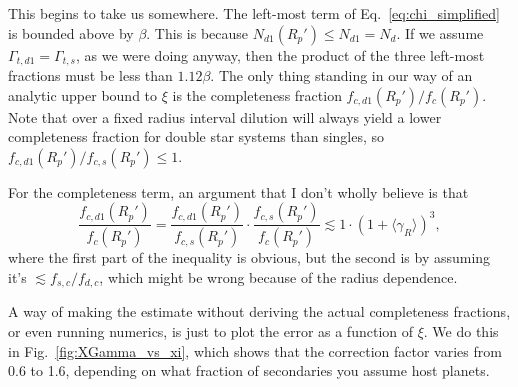 \documentclass{emulateapj}
\begin{document}
This begins to take us somewhere. The left-most term of 
Eq.~\ref{eq:chi_simplified} is bounded above by $\beta$. This is because 
$N_{d1}(R_p') \leq N_{d1} = N_d$.
If we assume $\Gamma_{t,d1} = \Gamma_{t,s}$, as we were doing 
anyway, then the product of the three left-most fractions must be less than 
$1.12\beta$.
The only thing standing in our way of an analytic upper bound to $\xi$ is the 
completeness fraction $f_{c,d1}(R_p')/f_c(R_p')$.
Note that over a fixed radius interval dilution will always 
yield a lower completeness fraction for double star systems than singles, so 
$f_{c,d1}(R_p') / f_{c,s}(R_p') \leq 1$.

For the completeness term, an argument that I don't wholly believe
is that
\begin{equation}
\frac{f_{c,d1}(R_p')}{f_c(R_p')} = \frac{f_{c,d1}(R_p')}{f_{c,s}(R_p')} \cdot
	\frac{f_{c,s}(R_p')}{f_{c}(R_p')} \lesssim 1 \cdot (1+\langle \gamma_R 
	\rangle)^3,
\end{equation}
where the first part of the inequality is obvious, but the second is by 
assuming it's $\lesssim f_{s,c}/f_{d,c}$, which might be wrong because of 
the radius dependence.

A way of making the estimate without deriving the actual 
completeness fractions, or even running numerics, is just to plot the error as 
a function of $\xi$. We do this in Fig.~\ref{fig:XGamma_vs_xi}, which 
shows that the correction factor varies from 0.6 to 1.6, depending on what 
fraction of secondaries you assume host planets.
\end{document}
